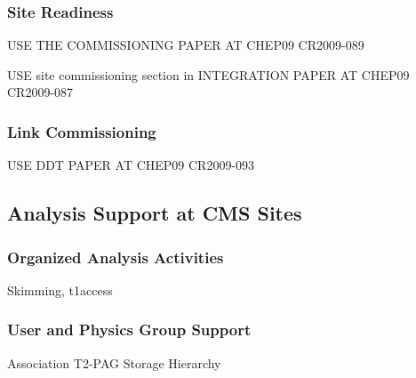 \label{sec:4_1_2}
\subsubsection{ Site Readiness }
\label{sec:4_1_3} 
USE THE COMMISSIONING PAPER AT CHEP09 CR2009-089

USE site commissioning section in INTEGRATION PAPER AT CHEP09 CR2009-087

\subsubsection{ Link Commissioning }
USE DDT PAPER AT CHEP09 CR2009-093
\label{sec:4_1_4}
\subsection{Analysis Support at CMS Sites}
\label{sec:4_2}
\subsubsection{ Organized Analysis Activities }
\label{sec:4_2_1}
Skimming, t1access
\subsubsection{ User and Physics Group Support }
\label{sec:4_2_2}
Association T2-PAG
Storage Hierarchy

